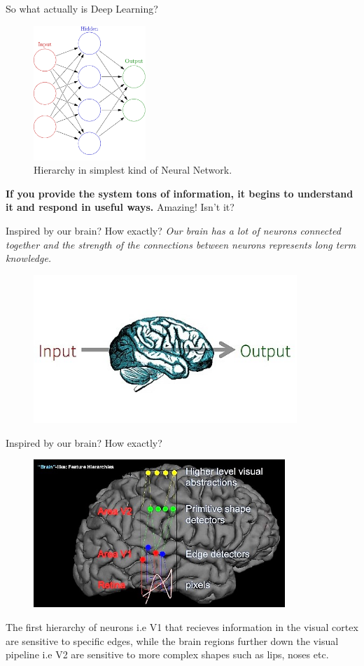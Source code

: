 \documentclass[10pt]{beamer}
\begin{document}
	\begin{frame}{So what actually is Deep Learning?}	
		\begin{figure}
			\includegraphics[height=2in]{images/ann}
			\caption{Hierarchy in simplest kind of Neural Network.}
		\end{figure}
		\pause
		\textbf {If you provide the system tons of information, it begins to understand it and respond in useful ways.}
		\pause
		\alert {Amazing! Isn't it?}
	\end{frame}
	\begin{frame}[c]{Inspired by our brain? How exactly?}
		\large{\textit{Our brain has a lot of neurons connected together and the strength of the connections between neurons represents long term knowledge.}}
		\begin{figure}
			\includegraphics[width=\linewidth,height=2.2in]{images/brain}
		\end{figure}
	\end{frame}
	\begin{frame}[c]{Inspired by our brain? How exactly?}
		\begin{figure}
			\includegraphics[width=\linewidth,height=2.2in]{images/brain_vision}
		\end{figure}
		The first hierarchy of neurons i.e \alert{V1} that recieves information in the visual cortex are sensitive to specific edges, while the brain regions further down the visual pipeline i.e \alert{V2} are sensitive to more complex shapes such as lips, noses etc.
	\end{frame}
\end{document}
